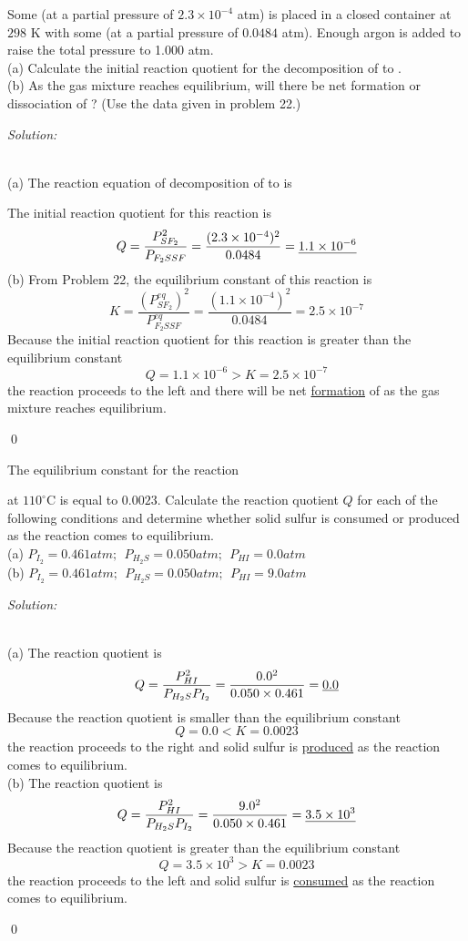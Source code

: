 \documentclass[12pt]{article}
\newenvironment{problem}[2][Problem]{\begin{trivlist}
\item[\hskip \labelsep {\bfseries #1}\hskip \labelsep {\bfseries #2.}]}{\end{trivlist}}
\newenvironment{sol}
    {\emph{Solution:}
    }
    {
    \qed
    }
\begin{document}
\begin{problem}{14.46}
Some  (at a partial pressure of $2.3\times10^{-4}$ atm) is placed in a closed container at $298$ K with some  (at a partial pressure of $0.0484$ atm). Enough argon is added to raise the total pressure to 1.000 atm.\\
(a) Calculate the initial reaction quotient for the decomposition of  to .\\
(b) As the gas mixture reaches equilibrium, will there be net formation or dissociation of ? (Use the data given in problem 22.)
\end{problem}
\begin{sol}
\\(a) The reaction equation of decomposition of  to  is
\begin{center}
\end{center}
The initial reaction quotient for this reaction is
\[
Q=\frac{P_{SF_2}^2}{P_{F_2SSF}}=\frac{(2.3\times10^{-4})^2}{0.0484}=\uline{1.1\times10^{-6}}
\]
(b) From Problem 22, the equilibrium constant of this reaction is
\[
K=\frac{(P_{SF_2}^{eq})^2}{P_{F_2SSF}^{eq}}=\frac{(1.1\times10^{-4})^2}{0.0484}=2.5\times10^{-7}
\]
Because the initial reaction quotient for this reaction is greater than the equilibrium constant
\[
Q=1.1\times10^{-6}>K=2.5\times10^{-7}
\]
the reaction proceeds to the left and there will be net \uline{formation} of  as the gas mixture reaches equilibrium.
\end{sol}

\begin{problem}{14.50}
The equilibrium constant for the reaction
\begin{center}
\end{center}
at $110 ^{\circ}$C is equal to $0.0023$. Calculate the reaction quotient $Q$ for each of the following conditions and determine whether solid sulfur is consumed or produced as the reaction comes to equilibrium.\\
(a) $P_{I_2}=0.461atm;~~P_{H_2S}=0.050atm;~~P_{HI}=0.0atm$\\
(b) $P_{I_2}=0.461atm;~~P_{H_2S}=0.050atm;~~P_{HI}=9.0atm$
\end{problem}
\begin{sol}
\\(a) The reaction quotient is
\[
Q=\frac{P_{HI}^2}{P_{H_2S}P_{I_2}}=\frac{0.0^2}{0.050\times0.461}=\uline{0.0}
\]
Because the reaction quotient is smaller than the equilibrium constant
\[
Q=0.0<K=0.0023
\]
the reaction proceeds to the right and solid sulfur is \uline{produced} as the reaction comes to equilibrium.\\
(b) The reaction quotient is
\[
Q=\frac{P_{HI}^2}{P_{H_2S}P_{I_2}}=\frac{9.0^2}{0.050\times0.461}=\uline{3.5\times10^3}
\]
Because the reaction quotient is greater than the equilibrium constant
\[
Q=3.5\times10^3>K=0.0023
\]
the reaction proceeds to the left and solid sulfur is \uline{consumed} as the reaction comes to equilibrium.
\end{sol}
\end{document}
